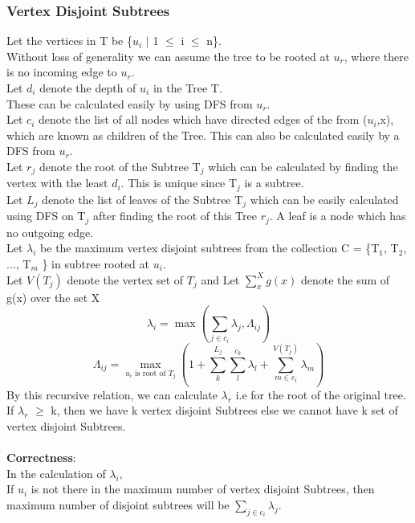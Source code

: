 \documentclass{report}
\begin{document}
 \subsubsection*{Vertex Disjoint Subtrees}
 Let the vertices in T be \{$u_i$ $|$ 1 $\leq$ i $\leq$ n\}.\\
 Without loss of generality we can assume the tree to be rooted at $u_r$, where there is no incoming edge to $u_r$.\\
 Let $d_i$ denote the depth of $u_i$ in the Tree T.\\
 These can be calculated easily by using DFS from $u_r$.\\
 Let $c_i$ denote the list of all nodes which have directed edges of the from ($u_i$,x), which are known as children of the Tree. This can also be calculated easily by a DFS from $u_r$.\\
 Let $r_j$ denote the root of the Subtree T$_j$ which can be calculated by finding the vertex with the least $d_i$. This is unique since T$_j$ is a subtree.\\
 Let $L_j$ denote the list of leaves of the Subtree T$_j$ which can be easily calculated using DFS on T$_j$ after finding the root of this Tree $r_j$. A leaf is a node which has no outgoing edge.\\
 Let $\lambda_i$ be the maximum vertex disjoint subtrees from the collection C = \{T$_1$, T$_2$,$\dots$, T$_m$ \} in subtree rooted at $u_i$.\\
 Let $V(T_j)$ denote the vertex set of $T_j$ and Let $\sum_{x}^{X} g(x)$ denote the sum of g(x) over the set X
 \begin{equation*}
     \lambda_i = \max(\sum_{j \in c_i} \lambda_j,\Lambda_{ij})
 \end{equation*}
 \begin{equation*}
     \Lambda_{ij} = \max_{u_i\text{ is root of }T_j }(1 + \sum_k^{L_j}\sum_l^{c_k} \lambda_l + \sum_{m \in c_i}^{V(T_j)} \lambda_m)
 \end{equation*}
 By this recursive relation, we can calculate $\lambda_r$ i.e for the root of the original tree.\\
 If $\lambda_r$ $\geq$ k, then we have k vertex disjoint Subtrees else we cannot have k set of vertex disjoint Subtrees.\\
 \vspace*{0.5em}\\
 \textbf{Correctness}: \\
 In the calculation of $\lambda_i$,\\
 If $u_i$ is not there in the maximum number of vertex disjoint Subtrees, then maximum number of disjoint subtrees will be $\sum_{j \in c_i} \lambda_j$.\\
\end{document}
